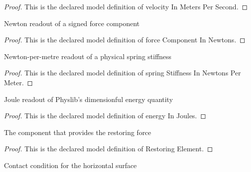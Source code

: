 \begin{proof}
  This is the declared model definition of velocity In Meters Per Second.
\end{proof}
\begin{definition}
  \label{def:physics:phyx-mini-0275:phyxminiproblems-problemphyxmini0275-forcecomponentinnewtons}
  Newton readout of a signed force component
\end{definition}
\begin{proof}
  This is the declared model definition of force Component In Newtons.
\end{proof}
\begin{definition}
  \label{def:physics:phyx-mini-0275:phyxminiproblems-problemphyxmini0275-springstiffnessinnewtonspermeter}
  Newton-per-metre readout of a physical spring stiffness
\end{definition}
\begin{proof}
  This is the declared model definition of spring Stiffness In Newtons Per Meter.
\end{proof}
\begin{definition}
  \label{def:physics:phyx-mini-0275:phyxminiproblems-problemphyxmini0275-energyinjoules}
  Joule readout of Physlib's dimensionful energy quantity
\end{definition}
\begin{proof}
  This is the declared model definition of energy In Joules.
\end{proof}
\begin{definition}
  \label{def:physics:phyx-mini-0275:phyxminiproblems-problemphyxmini0275-restoringelement}
  The component that provides the restoring force
\end{definition}
\begin{proof}
  This is the declared model definition of Restoring Element.
\end{proof}
\begin{definition}
  \label{def:physics:phyx-mini-0275:phyxminiproblems-problemphyxmini0275-surfacecondition}
  Contact condition for the horizontal surface
\end{definition}
